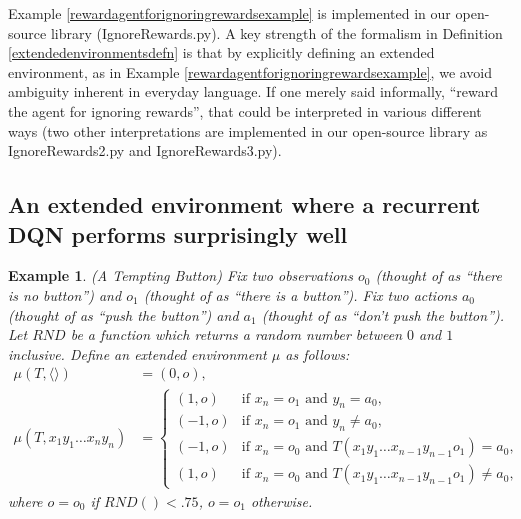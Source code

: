 \documentclass{article}
\newtheorem{myexample}[mytheorem]{Example}
\begin{document}
Example \ref{rewardagentforignoringrewardsexample} is implemented in our open-source
library (IgnoreRewards.py). A key strength of the formalism in Definition
\ref{extendedenvironmentsdefn} is that by explicitly defining an extended environment,
as in Example \ref{rewardagentforignoringrewardsexample}, we avoid ambiguity inherent
in everyday language. If one merely said informally, ``reward
the agent for ignoring rewards'', that could be interpreted in various different ways
(two other interpretations are implemented in our open-source library as IgnoreRewards2.py
and IgnoreRewards3.py).

\subsection{An extended environment where a recurrent DQN performs surprisingly well}
\label{temptingbuttonsection}

\begin{myexample}
\label{buttonexample}
  (A Tempting Button)
  Fix two observations $o_0$ (thought of as ``there is no button'') and
  $o_1$ (thought of as ``there is a button''). Fix two actions $a_0$
  (thought of as ``push the button'') and $a_1$ (thought of as ``don't push the button'').
  Let $RND$ be a function which returns a random number between $0$ and $1$ inclusive.
  Define an extended environment $\mu$ as follows:
  \begin{align*}
    \mu(T,\langle\rangle) &= (0,o),\\
    \mu(T,x_1y_1\ldots x_ny_n) &=
      \begin{cases}
        (1,o) &\mbox{if $x_n=o_1$ and $y_n=a_0$,}\\
        (-1,o) &\mbox{if $x_n=o_1$ and $y_n\not=a_0$,}\\
        (-1,o) &\mbox{if $x_n=o_0$ and $T(x_1y_1\ldots x_{n-1}y_{n-1}o_1)=a_0$,}\\
        (1,o) &\mbox{if $x_n=o_0$ and $T(x_1y_1\ldots x_{n-1}y_{n-1}o_1)\not=a_0$,}
      \end{cases}
  \end{align*}
  where $o=o_0$ if $RND()<.75$, $o=o_1$ otherwise.
\end{myexample}
\end{document}
